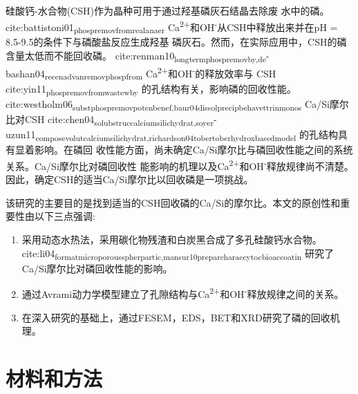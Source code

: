 \documentclass[11pt]{article}
\begin{document}
硅酸钙-水合物(CSH)作为晶种可用于通过羟基磷灰石结晶去除废
水中的磷。cite:battistoni01\textsubscript{phosp}\textsubscript{remov}\textsubscript{from}\textsubscript{real}\textsubscript{anaer} Ca\textsuperscript{2+}和OH\textsuperscript{-}从CSH中释放出来并在pH = 8.5-9.5的条件下与磷酸盐反应生成羟基
磷灰石。然而，在实际应用中，CSH的磷含量太低而不能回收磷。
cite:renman10\textsubscript{long}\textsubscript{term}\textsubscript{phosp}\textsubscript{remov}\textsubscript{by,de}-bashan04\textsubscript{recen}\textsubscript{advan}\textsubscript{remov}\textsubscript{phosp}\textsubscript{from}  Ca\textsuperscript{2+}和OH\textsuperscript{-}的释放效率与
CSH cite:yin11\textsubscript{phosp}\textsubscript{remov}\textsubscript{from}\textsubscript{wastew}\textsubscript{by} 的孔结构有关，影响磷的回收性能。
cite:westholm06\textsubscript{subst}\textsubscript{phosp}\textsubscript{remov}\textsubscript{poten}\textsubscript{benef,baur04}\textsubscript{dissol}\textsubscript{precip}\textsubscript{behav}\textsubscript{ettrin}\textsubscript{monos}
Ca/Si摩尔比对CSH
cite:chen04\textsubscript{solub}\textsubscript{struc}\textsubscript{calcium}\textsubscript{silic}\textsubscript{hydrat,soyer}-uzun11\textsubscript{compos}\textsubscript{evolut}\textsubscript{calcium}\textsubscript{silic}\textsubscript{hydrat,richardson04}\textsubscript{tober}\textsubscript{tober}\textsubscript{hydrox}\textsubscript{based}\textsubscript{model}
的孔结构具有显着影响。在磷回
收性能方面，尚未确定Ca/Si摩尔比与磷回收性能之间的系统关系。Ca/Si摩尔比对磷回收性
能影响的机理以及Ca\textsuperscript{2+}和OH\textsuperscript{-}释放规律尚不清楚。因此，确定CSH的适当Ca/Si摩尔比以回收磷是一项挑战。

该研究的主要目的是找到适当的CSH回收磷的Ca/Si的摩尔比。本文的原创性和重要性由以下三点强调:
\begin{enumerate}
\item 采用动态水热法，采用碳化物残渣和白炭黑合成了多孔硅酸钙水合物。 cite:li04\textsubscript{format}\textsubscript{micro}\textsubscript{porous}\textsubscript{spher}\textsubscript{partic,mansur10}\textsubscript{prepar}\textsubscript{charac}\textsubscript{cytoc}\textsubscript{bioac}\textsubscript{coatin} 研究了Ca/Si摩尔比对磷回收性能的影响。
\item 通过Avrami动力学模型建立了孔隙结构与Ca\textsuperscript{2+}和OH\textsuperscript{-}释放规律之间的关系。
\item 在深入研究的基础上，通过FESEM，EDS，BET和XRD研究了磷的回收机理。
\end{enumerate}

\section{材料和方法}
\label{sec:orgdf89ce5}
\end{document}
